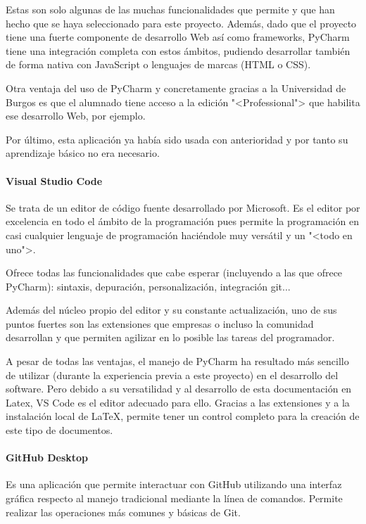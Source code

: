 Estas son solo algunas de las muchas funcionalidades que permite y que han hecho
que se haya seleccionado para este proyecto. Además, dado que el proyecto tiene
una fuerte componente de desarrollo Web así como frameworks, PyCharm tiene una
integración completa con estos ámbitos, pudiendo desarrollar también de forma
nativa con JavaScript o lenguajes de marcas (HTML o CSS).

Otra ventaja del uso de PyCharm y concretamente gracias a la Universidad de
Burgos es que el alumnado tiene acceso a la edición "<Professional"> que
habilita ese desarrollo Web, por ejemplo.

Por último, esta aplicación ya había sido usada con anterioridad y por tanto su
aprendizaje básico no era necesario.

\paragraph{Visual Studio Code}
Se trata de un editor de código fuente desarrollado por Microsoft. Es el editor
por excelencia en todo el ámbito de la programación pues permite la programación
en casi cualquier lenguaje de programación haciéndole muy versátil y un "<todo
en uno">.

Ofrece todas las funcionalidades que cabe esperar (incluyendo a las que ofrece
PyCharm): sintaxis, depuración, personalización, integración git...

Además del núcleo propio del editor y su constante actualización, uno de sus
puntos fuertes son las extensiones que empresas o incluso la comunidad
desarrollan y que permiten agilizar en lo posible las tareas del programador.

A pesar de todas las ventajas, el manejo de PyCharm ha resultado más sencillo de
utilizar (durante la experiencia previa a este proyecto) en el desarrollo del
software. Pero debido a su versatilidad y al desarrollo de esta
documentación en Latex, VS Code es el editor adecuado para ello. Gracias a las
extensiones y a la instalación local de \LaTeX, permite tener un control completo
para la creación de este tipo de documentos. 


\paragraph{GitHub Desktop}
Es una aplicación que permite interactuar con GitHub utilizando una interfaz
gráfica respecto al manejo tradicional mediante la línea de comandos. Permite
realizar las operaciones más comunes y básicas de Git.

